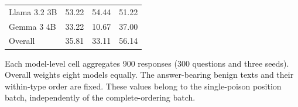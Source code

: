 \begin{table}[!htbp]
\begin{tabular}{@{}lrrr@{}}
Llama 3.2 3B & 53.22 & 54.44 & 51.22 \\
Gemma 3 4B & 33.22 & 10.67 & 37.00 \\
Overall & 35.81 & 33.11 & 56.14 \\
\bottomrule
\end{tabular}
\endgroup
\par\vspace{4pt}\begin{minipage}{\linewidth}\footnotesize Each model-level cell aggregates 900 responses (300 questions and three seeds). Overall weights eight models equally. The answer-bearing benign texts and their within-type order are fixed. These values belong to the single-poison position batch, independently of the complete-ordering batch.\end{minipage}
\end{table}
